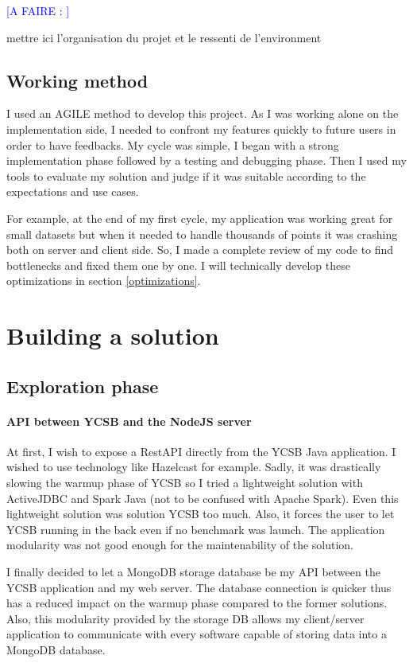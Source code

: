 \documentclass[a4paper,11pt]{article}
\newcommand*{\todo}[1]{\textcolor{blue}{[A FAIRE : \emph{#1}]}}
\begin{document}
\todo{}

mettre ici l'organisation du projet et le ressenti de l'environment

\subsection{Working method}

I used an AGILE method to develop this project. As I was working alone on the implementation side, I needed to confront my features quickly to future users in order to have feedbacks.
My cycle was simple, I began with a strong implementation phase followed by a testing and debugging phase. Then I used my tools to evaluate my solution and judge if it was suitable according to the expectations and use cases.

For example, at the end of my first cycle, my application was working great for small datasets but when it needed to handle thousands of points it was crashing both on server and client side.
So, I made a complete review of my code to find bottlenecks and fixed them one by one. I will technically develop these optimizations in section \ref{optimizations}.

\clearpage

\section{Building a solution}

\subsection{Exploration phase}

\paragraph{API between YCSB and the NodeJS server}

At first, I wish to expose a RestAPI directly from the YCSB Java application. I wished to use technology like Hazelcast for example. Sadly, it was drastically slowing the warmup phase of YCSB so I tried a lightweight solution with ActiveJDBC and Spark Java (not to be confused with Apache Spark). Even this lightweight solution was solution YCSB too much. Also, it forces the user to let YCSB running in the back even if no benchmark was launch. The application modularity was not good enough for the maintenability of the solution.

I finally decided to let a MongoDB storage database be my API between the YCSB application and my web server. The database connection is quicker thus has a reduced impact on the warmup phase compared to the former solutions. Also, this modularity provided by the storage DB allows my client/server application to communicate with every software capable of storing data into a MongoDB database.
\end{document}
